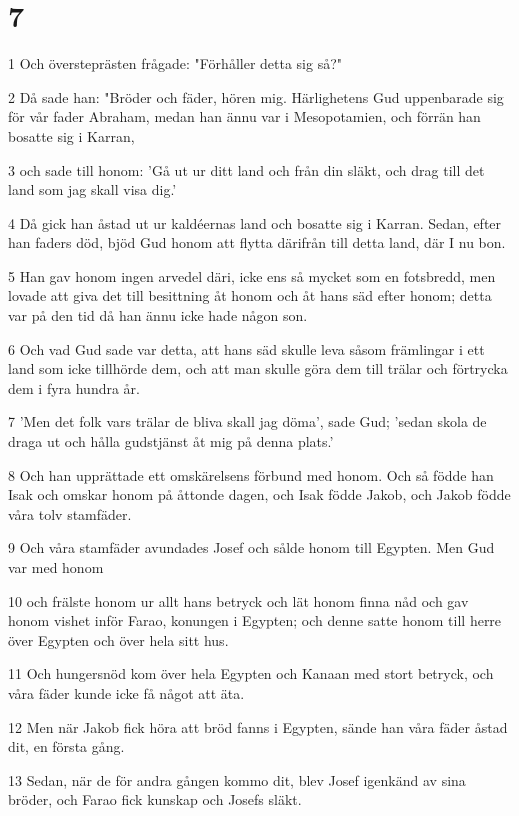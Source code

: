 \chapter{7}

\par 1 Och översteprästen frågade: "Förhåller detta sig så?"
\par 2 Då sade han: "Bröder och fäder, hören mig. Härlighetens Gud uppenbarade sig för vår fader Abraham, medan han ännu var i Mesopotamien, och förrän han bosatte sig i Karran,
\par 3 och sade till honom: 'Gå ut ur ditt land och från din släkt, och drag till det land som jag skall visa dig.'
\par 4 Då gick han åstad ut ur kaldéernas land och bosatte sig i Karran. Sedan, efter han faders död, bjöd Gud honom att flytta därifrån till detta land, där I nu bon.
\par 5 Han gav honom ingen arvedel däri, icke ens så mycket som en fotsbredd, men lovade att giva det till besittning åt honom och åt hans säd efter honom; detta var på den tid då han ännu icke hade någon son.
\par 6 Och vad Gud sade var detta, att hans säd skulle leva såsom främlingar i ett land som icke tillhörde dem, och att man skulle göra dem till trälar och förtrycka dem i fyra hundra år.
\par 7 'Men det folk vars trälar de bliva skall jag döma', sade Gud; 'sedan skola de draga ut och hålla gudstjänst åt mig på denna plats.'
\par 8 Och han upprättade ett omskärelsens förbund med honom. Och så födde han Isak och omskar honom på åttonde dagen, och Isak födde Jakob, och Jakob födde våra tolv stamfäder.
\par 9 Och våra stamfäder avundades Josef och sålde honom till Egypten. Men Gud var med honom
\par 10 och frälste honom ur allt hans betryck och lät honom finna nåd och gav honom vishet inför Farao, konungen i Egypten; och denne satte honom till herre över Egypten och över hela sitt hus.
\par 11 Och hungersnöd kom över hela Egypten och Kanaan med stort betryck, och våra fäder kunde icke få något att äta.
\par 12 Men när Jakob fick höra att bröd fanns i Egypten, sände han våra fäder åstad dit, en första gång.
\par 13 Sedan, när de för andra gången kommo dit, blev Josef igenkänd av sina bröder, och Farao fick kunskap och Josefs släkt.
